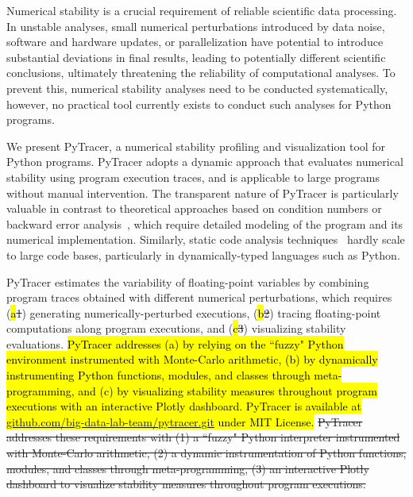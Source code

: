 \documentclass[10pt,journal,compsoc]{IEEEtran}
\newcommand{\pytracer}[0]{PyTracer\xspace}
\DeclareRobustCommand{\add}[1]{\sethlcolor{lightgreen}\hl{#1}}
\DeclareRobustCommand{\remove}[1]{\textcolor{lightred}{\sout{#1}}}
\DeclareRobustCommand{\addCite}[1]{\textcolor{lightgreen}{\mbox{#1}}}
\begin{document}
Numerical stability is a crucial requirement of reliable scientific data
processing. In unstable analyses, small numerical perturbations introduced by
data noise, software and hardware updates, or parallelization have potential to
introduce substantial deviations in final results, leading to potentially
different scientific conclusions, ultimately threatening the reliability of
computational analyses. To prevent this, numerical stability analyses need to be
conducted systematically, however, no practical tool currently exists to conduct
such analyses for Python programs.

We present PyTracer, a numerical stability profiling and visualization tool for
Python programs. \pytracer adopts a dynamic approach that evaluates numerical
stability using program execution traces, and is applicable to large programs
without manual intervention. The transparent nature of \pytracer is particularly
valuable in contrast to theoretical approaches based on condition numbers or
backward error analysis~\addCite{\cite{higham2002accuracy}}, which require
detailed modeling of the program and its numerical implementation. Similarly,
static code analysis techniques~\addCite{\cite{goubault2006static}} hardly scale
to large code bases, particularly in dynamically-typed languages such as Python.

\pytracer estimates the variability of floating-point variables by combining
program traces obtained with different numerical perturbations, which requires
(\add{a}\remove{1}) generating numerically-perturbed executions,
(\add{b}\remove{2}) tracing floating-point computations along program
executions, and (\add{c}\remove{3}) visualizing stability evaluations.
\add{PyTracer addresses (a) by relying on the ``fuzzy" Python environment instrumented with Monte-Carlo
    arithmetic, (b) by dynamically instrumenting Python functions,
    modules, and classes through meta-programming, and (c) by visualizing stability measures throughout program executions
    with an interactive Plotly
    dashboard.
    \mbox{\pytracer} is available at
    \mbox{\href{https://github.com/big-data-lab-team/pytracer.git}{github.com/big-data-lab-team/pytracer.git}}
    under MIT License.} \remove{\mbox{\pytracer} addresses these requirements with
    (1) a ``fuzzy" Python interpreter instrumented with Monte-Carlo arithmetic, (2)
    a dynamic instrumentation of Python functions, modules, and classes through
    meta-programming, (3) an interactive Plotly dashboard to visualize stability
    measures throughout program executions. }
\end{document}
